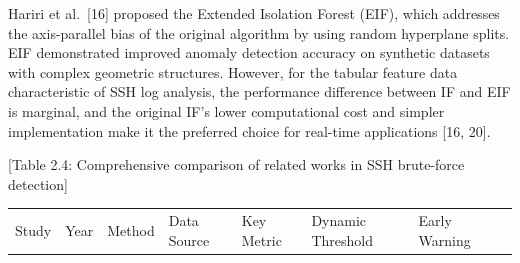 \documentclass[
  a4paper]{report}
\newcounter{none} %
\begin{document}
Hariri et al.~{[}16{]} proposed the Extended Isolation Forest (EIF),
which addresses the axis-parallel bias of the original algorithm by
using random hyperplane splits. EIF demonstrated improved anomaly
detection accuracy on synthetic datasets with complex geometric
structures. However, for the tabular feature data characteristic of SSH
log analysis, the performance difference between IF and EIF is marginal,
and the original IF's lower computational cost and simpler
implementation make it the preferred choice for real-time applications
{[}16, 20{]}.

{[}Table 2.4: Comprehensive comparison of related works in SSH
brute-force detection{]}

{\def\LTcaptype{none} %
\begin{longtable}[]{@{}
  >{\raggedright\arraybackslash}p{}
  >{\raggedright\arraybackslash}p{}
  >{\raggedright\arraybackslash}p{}
  >{\raggedright\arraybackslash}p{}
  >{\raggedright\arraybackslash}p{}
  >{\raggedright\arraybackslash}p{}
  >{\raggedright\arraybackslash}p{}
  >{\raggedright\arraybackslash}p{}@{}}
\toprule\noalign{}
\begin{minipage}[b]{\linewidth}\raggedright
Study
\end{minipage} & \begin{minipage}[b]{\linewidth}\raggedright
Year
\end{minipage} & \begin{minipage}[b]{\linewidth}\raggedright
Method
\end{minipage} & \begin{minipage}[b]{\linewidth}\raggedright
Data Source
\end{minipage} & \begin{minipage}[b]{\linewidth}\raggedright
Key Metric
\end{minipage} & \begin{minipage}[b]{\linewidth}\raggedright
Dynamic Threshold
\end{minipage} & \begin{minipage}[b]{\linewidth}\raggedright
Early Warning
\end{minipage} & \begin{minipage}[b]{\linewidth}\raggedright

\end{minipage}
\end{longtable}}
\end{document}
